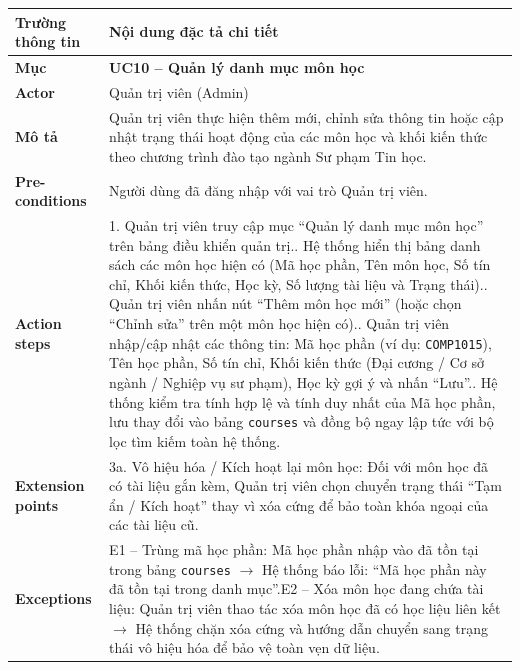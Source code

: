 \begin{table}[H]
\centering
\footnotesize\linespread{1.05}\selectfont
\setlength{\tabcolsep}{5pt}
\renewcommand{\arraystretch}{1.12}
\begin{tabularx}{\textwidth}{|p{3.5cm}|X|}
\hline
\rowcolor[HTML]{EAEAEA}
\textbf{Trường thông tin} & \textbf{Nội dung đặc tả chi tiết} \\
\hline
\textbf{Mục} & \textbf{UC10 -- Quản lý danh mục môn học} \\
\hline
\textbf{Actor} & Quản trị viên (Admin) \\
\hline
\textbf{Mô tả} & Quản trị viên thực hiện thêm mới, chỉnh sửa thông tin hoặc cập nhật trạng thái hoạt động của các môn học và khối kiến thức theo chương trình đào tạo ngành Sư phạm Tin học. \\
\hline
\textbf{Pre-conditions} & Người dùng đã đăng nhập với vai trò Quản trị viên. \\
\hline
\textbf{Action steps} & 1. Quản trị viên truy cập mục ``Quản lý danh mục môn học'' trên bảng điều khiển quản trị.\newline 2. Hệ thống hiển thị bảng danh sách các môn học hiện có (Mã học phần, Tên môn học, Số tín chỉ, Khối kiến thức, Học kỳ, Số lượng tài liệu và Trạng thái).\newline 3. Quản trị viên nhấn nút ``Thêm môn học mới'' (hoặc chọn ``Chỉnh sửa'' trên một môn học hiện có).\newline 4. Quản trị viên nhập/cập nhật các thông tin: Mã học phần (ví dụ: \texttt{COMP1015}), Tên học phần, Số tín chỉ, Khối kiến thức (Đại cương / Cơ sở ngành / Nghiệp vụ sư phạm), Học kỳ gợi ý và nhấn ``Lưu''.\newline 5. Hệ thống kiểm tra tính hợp lệ và tính duy nhất của Mã học phần, lưu thay đổi vào bảng \texttt{courses} và đồng bộ ngay lập tức với bộ lọc tìm kiếm toàn hệ thống. \\
\hline
\textbf{Extension points} & 3a. Vô hiệu hóa / Kích hoạt lại môn học: Đối với môn học đã có tài liệu gắn kèm, Quản trị viên chọn chuyển trạng thái ``Tạm ẩn / Kích hoạt'' thay vì xóa cứng để bảo toàn khóa ngoại của các tài liệu cũ. \\
\hline
\textbf{Exceptions} & E1 -- Trùng mã học phần: Mã học phần nhập vào đã tồn tại trong bảng \texttt{courses} $\rightarrow$ Hệ thống báo lỗi: ``Mã học phần này đã tồn tại trong danh mục''.\newline E2 -- Xóa môn học đang chứa tài liệu: Quản trị viên thao tác xóa môn học đã có học liệu liên kết $\rightarrow$ Hệ thống chặn xóa cứng và hướng dẫn chuyển sang trạng thái vô hiệu hóa để bảo vệ toàn vẹn dữ liệu. \\

\end{tabularx}
\end{table}

